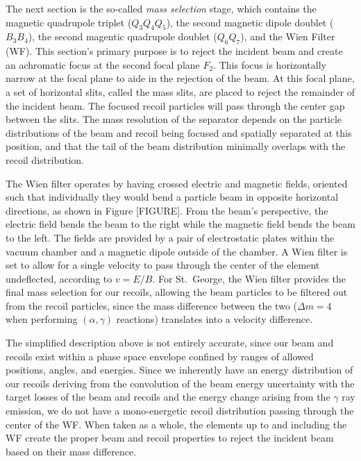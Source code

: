 The next section is the so-called \textit{mass selection} stage, which contains
the
magnetic quadrupole triplet ($Q_3Q_4Q_5$), the second magnetic dipole doublet
($B_3B_4$), the second magentic quadrupole doublet ($Q_6Q_7$), and the Wien
Filter (WF). This section's primary purpose is to reject the incident beam and
create an achromatic focus at the second focal plane $F_2$. This focus is
horizontally narrow at the focal plane to aide in the rejection of the beam.
At this focal plane, a set of horizontal slits, called the mass slits,
are placed to reject the remainder of the incident beam. The focused recoil
particles will pass through the center gap between the slits. The mass
resolution of the separator depends on the particle distributions of the beam
and recoil being focused and spatially separated at this position, and that the
tail of the beam distribution minimally overlaps with the recoil distribution.

The Wien filter operates by having crossed electric and magnetic fields,
oriented such that individually they would bend a particle beam in opposite
horizontal directions, as shown in Figure [FIGURE]. From the beam's
perspective, the electric field bends the beam to the right while the magnetic
field bends the beam to the left. The fields are provided by a pair of
electrostatic plates within the vacuum chamber and a magnetic dipole outside of
the chamber. A Wien filter is set to allow for a single velocity to pass
through the center of the element undeflected, according to $v = E/B$. For
St.\ George, the Wien filter provides the final mass selection for our recoils,
allowing the beam particles to be filtered out from the recoil particles, since
the mass difference between the two ($\Delta m = 4$ when performing
$(\alpha,\gamma)$ reactions) translates into a velocity difference.

The simplified description above is not entirely accurate, since our beam and
recoils exist within a phase space envelope confined by ranges of allowed
positions, angles, and energies. Since we inherently have an energy
distribution of our recoils deriving from the convolution of the beam energy
uncertainty with the target losses of the beam and recoils and the energy
change arising from the $\gamma$ ray emission, we do not have a mono-energetic
recoil distribution passing through the center of the WF. When taken as a
whole, the elements up to and including the WF create the proper beam and
recoil properties to reject the incident beam based on their mass difference.

